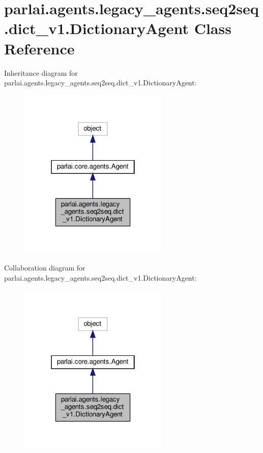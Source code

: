 \hypertarget{classparlai_1_1agents_1_1legacy__agents_1_1seq2seq_1_1dict__v1_1_1DictionaryAgent}{}\section{parlai.\+agents.\+legacy\+\_\+agents.\+seq2seq.\+dict\+\_\+v1.\+Dictionary\+Agent Class Reference}
\label{classparlai_1_1agents_1_1legacy__agents_1_1seq2seq_1_1dict__v1_1_1DictionaryAgent}


Inheritance diagram for parlai.\+agents.\+legacy\+\_\+agents.\+seq2seq.\+dict\+\_\+v1.\+Dictionary\+Agent\+:\nopagebreak
\begin{figure}[H]
\begin{center}
\leavevmode
\includegraphics[width=202pt]{dd/d9a/classparlai_1_1agents_1_1legacy__agents_1_1seq2seq_1_1dict__v1_1_1DictionaryAgent__inherit__graph}
\end{center}
\end{figure}


Collaboration diagram for parlai.\+agents.\+legacy\+\_\+agents.\+seq2seq.\+dict\+\_\+v1.\+Dictionary\+Agent\+:
\nopagebreak
\begin{figure}[H]
\begin{center}
\leavevmode
\includegraphics[width=202pt]{d0/def/classparlai_1_1agents_1_1legacy__agents_1_1seq2seq_1_1dict__v1_1_1DictionaryAgent__coll__graph}
\end{center}
\end{figure}
